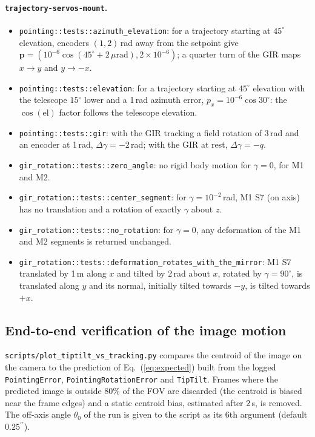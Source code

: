 \documentclass{gmto}
\numberwithin{table}{section}
\numberwithin{equation}{section}
\newcommand{\code}[1]{\texttt{#1}}
\newcommand{\arcsec}{^{\prime\prime}}
\newcommand{\vect}[1]{\boldsymbol{#1}}
\begin{document}
\paragraph{\code{trajectory-servos-mount}.}
\begin{itemize}
\item \code{pointing::tests::azimuth\_elevation}: for a trajectory starting at $45^\circ$ elevation,
  encoders $(1, 2)$\,\textmu rad away from the setpoint give
  $\vect{p} = (10^{-6}\cos(45^\circ + 2\,\mu\mathrm{rad}), 2\times 10^{-6})$; a quarter turn of
  the GIR maps $x\to y$ and $y\to -x$.
\item \code{pointing::tests::elevation}: for a trajectory starting at $45^\circ$ elevation with the
  telescope $15^\circ$ lower and a 1\,\textmu rad azimuth error, $p_x = 10^{-6}\cos 30^\circ$: the
  $\cos(\mathrm{el})$ factor follows the telescope elevation.
\item \code{pointing::tests::gir}: with the GIR tracking a field rotation of 3\,\textmu rad and an encoder
  at 1\,\textmu rad, $\Delta\gamma = -2$\,\textmu rad; with the GIR at rest, $\Delta\gamma = -q$.
\item \code{gir\_rotation::tests::zero\_angle}: no rigid body motion for $\gamma = 0$, for M1 and M2.
\item \code{gir\_rotation::tests::center\_segment}: for $\gamma = 10^{-2}$\,rad, M1 S7 (on axis) has no
  translation and a rotation of exactly $\gamma$ about $z$.
\item \code{gir\_rotation::tests::no\_rotation}: for $\gamma = 0$, any deformation of the M1 and M2
  segments is returned unchanged.
\item \code{gir\_rotation::tests::deformation\_rotates\_with\_the\_mirror}: M1 S7 translated by
  1\,\textmu m along $x$ and tilted by 2\,\textmu rad about $x$, rotated by $\gamma = 90^\circ$, is translated
  along $y$ and its normal, initially tilted towards $-y$, is tilted towards $+x$.
\end{itemize}

\subsection{End-to-end verification of the image motion}
\label{sec:ver-e2e}

\code{scripts/plot\_tiptilt\_vs\_tracking.py} compares the centroid of the image on the camera
to the prediction of Eq.~(\ref{eq:expected}) built from the logged \code{PointingError},
\code{PointingRotationError} and \code{TipTilt}. Frames where the predicted image is outside 80\% of the
FOV are discarded (the centroid is biased near the frame edges) and a static centroid bias,
estimated after 2\,s, is removed. The off-axis angle $\theta_0$ of the run is given to the script
as its 6th argument (default $0.25\arcsec$).
\end{document}
